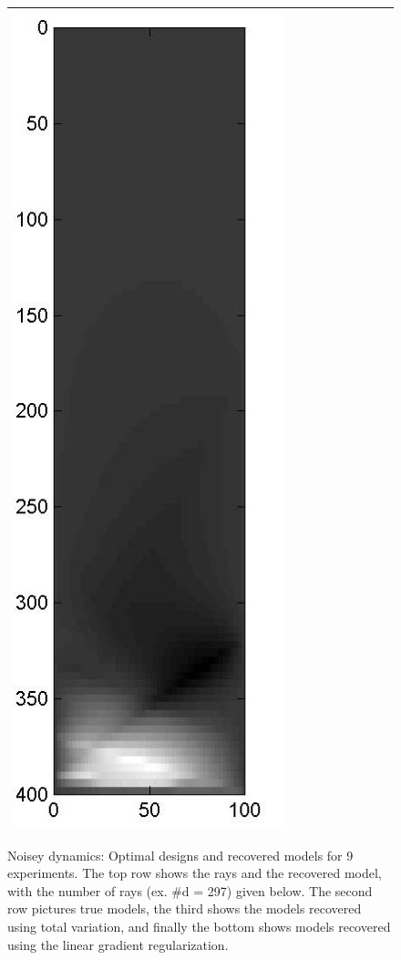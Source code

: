 \documentclass[11pt]{article}
\begin{document}
\begin{figure}[!h]
\begin{center}
\begin{tabular}{|c|c|c|c|c|c|c|c|c|}
			\includegraphics[width=.9\iwidth]{figures/newFigs/noisy/resultsExp-9-mk}		
			\\			
			\hline
		\end{tabular}
	\end{center}
	\caption{Noisey dynamics: Optimal designs and recovered models for 9 experiments. The top row shows the rays and the recovered model, with the number of rays (ex. \#d = 297) given below. The second row pictures true models, the third shows the  models recovered using total variation, and finally the bottom shows models recovered using the linear gradient regularization.}
	\label{fig:results2}
\end{figure}
\end{document}
